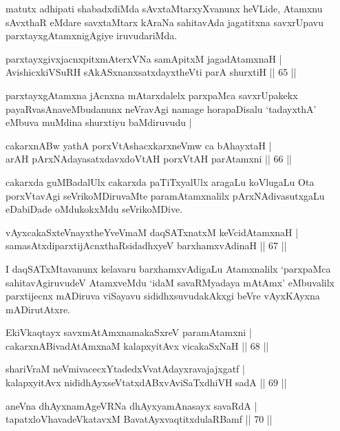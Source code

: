 \begin{artha}
matutx adhipati shabadxdiMda sAvxtaMtarxyXvanunx heVLide, Atamxnu sAvxthaR eMdare savxtaMtarx kAraNa sahitavAda jagatitxna savxrUpavu parxtayxgAtamxnigAgiye iruvudariMda.
\end{artha}


\begin{shl}
parxtayxgivxjacnxpitxmAterxVNa samApitxM jagadAtamxnaH |\\
AvishicxkiVSuRH sAkASxnanxsatxdayxtheVti parA shurxtiH \hfill || 65 ||
\end{shl}

\begin{artha}
parxtayxgAtamxna jAcnxna mAtarxdalelx parxpaMca savxrUpakekx
payaRvasAnaveMbudanunx neVravAgi namage horapaDisalu `tadayxthA' eMbuva
muMdina shurxtiyu baMdiruvudu |
\end{artha}

\begin{shl}
cakarxnABw yathA porxVtAshacxkarxneVmw ca bAhayxtaH |\\
arAH pArxNAdayasatxdavxdoVtAH porxVtAH parAtamxni \hfill || 66 ||
\end{shl}

\begin{artha}
cakarxda guMBadalUlx cakarxda paTiTxyalUlx aragaLu koVlugaLu Ota porxVtavAgi seVrikoMDiruvaMte paramAtamxnalilx pArxNAdivasutxgaLu eDabiDade oMdukokxMdu seVrikoMDive.
\end{artha}


\begin{shl}
vAyxcakaSxteV\s nayxtheYveVmaM daqSATxnatxM keVcidAtamxnaH |\\
samasAtxdiparxtijAcnxthaRsidadhxyeV barxhamxvAdinaH \hfill || 67 ||
\end{shl}

\begin{artha}
I daqSATxMtavanunx kelavaru barxhamxvAdigaLu Atamxnalilx `parxpaMca sahitavAgiruvudeV AtamxveMdu `idaM savaRMyadaya mAtAmx' eMbuvalilx parxtijecnx mADiruva viSayavu sididhxsuvudakAkxgi beVre vAyxKAyxna mADirutAtxre.
\end{artha}

\begin{shl}
EkiVkaqtayx savxmAtAmxnamakaSxreV paramAtamxni |\\
cakarxnABivadAtAmxnaM kalapxyitAvx vicakaSxNaH \hfill || 68 ||
\end{shl}
\begin{shl}
shariVraM neVmivacecxYtadedxVvatAdayxravajajxgatf |\\
kalapxyitAvx nididhAyxseVtatxdABxvAviSaTxdhiVH sadA \hfill || 69 ||
\end{shl}
\begin{shl}
aneVna dhAyxnamAgeVRNa dhAyxyamAnasayx savaRdA |\\
tapatxloVhavadeVkatavxM BavatAyxvaqtitxdulaRBamf \hfill || 70 ||
\end{shl}

